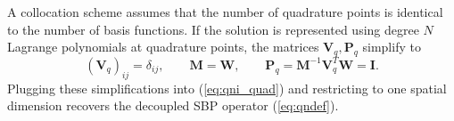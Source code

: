 \documentclass[review,onefignum,onetabnum,final]{siamart171218}
\newcommand{\LRp}[1]{\left( #1 \right)}
\newcommand{\note}[1]{{\color{blue}{#1}}}
\begin{document}
A collocation scheme assumes that the number of quadrature points is identical to the number of basis functions.  If the solution is represented using degree $N$ Lagrange polynomials at quadrature points, the matrices $\bm{V}_q, \bm{P}_q$ simplify to
\[
\LRp{\bm{V}_q}_{ij} = \delta_{ij}, \qquad \bm{M} = \bm{W}, \qquad \bm{P}_q = \bm{M}^{-1}\bm{V}_q^T\bm{W} = \bm{I}.
\]
Plugging these simplifications into (\ref{eq:qni_quad}) and restricting to one spatial dimension recovers the decoupled SBP operator (\ref{eq:qndef}).




\end{document}
